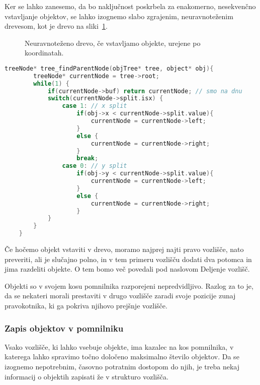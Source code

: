 \documentclass[a4paper,12pt]{article}
\begin{document}
Ker se lahko zanesemo, da bo naključnost poskrbela za enakomerno, nesekvenčno vstavljanje objektov, se lahko
izognemo slabo zgrajenim, neuravnoteženim drevesom, kot je drevo na sliki~\ref{fig:drevo_unbal}.
\begin{figure}
    \centering
    
    \caption{Neuravnoteženo drevo, če vstavljamo objekte, urejene po koordinatah.}%
    \label{fig:drevo_unbal}
\end{figure}
\begin{lstlisting}[float, caption={Iskanje vozlišča, ki vsebuje objekt}, label=find_parent_node, language=C]
    treeNode* tree_findParentNode(objTree* tree, object* obj){
        treeNode* currentNode = tree->root;
        while(1) {
            if(currentNode->buf) return currentNode; // smo na dnu
            switch(currentNode->split.isx) {
                case 1: // x split
                    if(obj->x < currentNode->split.value){
                        currentNode = currentNode->left;
                    }
                    else {
                        currentNode = currentNode->right;
                    }
                    break;
                case 0: // y split
                    if(obj->y < currentNode->split.value){
                        currentNode = currentNode->left;
                    }
                    else {
                        currentNode = currentNode->right;
                    }
            }
        }
    }
\end{lstlisting}


Če hočemo objekt vstaviti v drevo, moramo najprej najti pravo vozlišče, nato preveriti,
ali je slučajno polno, in v tem primeru vozlišču dodati dva potomca in jima razdeliti objekte.
O tem bomo več povedali pod naslovom Deljenje vozlišč.

Objekti so v svojem kosu pomnilnika razporejeni nepredvidljivo. Razlog za to je, da se nekateri
morali prestaviti v drugo vozlišče zaradi svoje pozicije zunaj pravokotnika, ki ga pokriva
njihovo prejšnje vozlišče.
\subsubsection{Zapis objektov v pomnilniku}
Vsako vozlišče, ki lahko vsebuje objekte, ima kazalec na kos pomnilnika, v katerega lahko spravimo
točno določeno maksimalno število objektov. Da se izognemo nepotrebnim, časovno potratnim dostopom
do njih, je treba nekaj informacij o objektih zapisati že v strukturo vozlišča.
\end{document}
